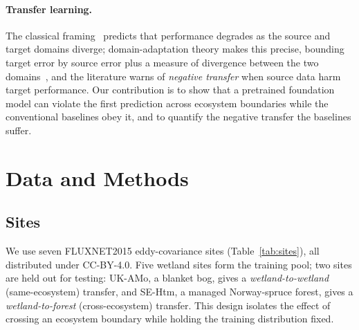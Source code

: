 \documentclass[sigconf]{acmart}          %
\begin{document}
\paragraph{Transfer learning.}
The classical framing~\cite{pan2010transfer,weiss2016transfer} predicts
that performance degrades as the source and target domains diverge; domain-adaptation
theory makes this precise, bounding target error by source error plus a measure of
divergence between the two domains~\cite{ben2010theory}, and the literature warns
of \emph{negative transfer} when source data harm target performance. Our
contribution is to show that a pretrained foundation model can violate the
first prediction across ecosystem boundaries while the conventional baselines
obey it, and to quantify the negative transfer the baselines suffer.

\section{Data and Methods}

\subsection{Sites}
We use seven FLUXNET2015 eddy-covariance sites (Table~\ref{tab:sites}),
all distributed under CC-BY-4.0. Five wetland sites form the training pool;
two sites are held out for testing: UK-AMo, a blanket bog, gives a
\emph{wetland-to-wetland} (same-ecosystem) transfer, and SE-Htm, a managed
Norway-spruce forest, gives a \emph{wetland-to-forest} (cross-ecosystem)
transfer. This design isolates the effect of crossing an ecosystem boundary
while holding the training distribution fixed.
\end{document}
